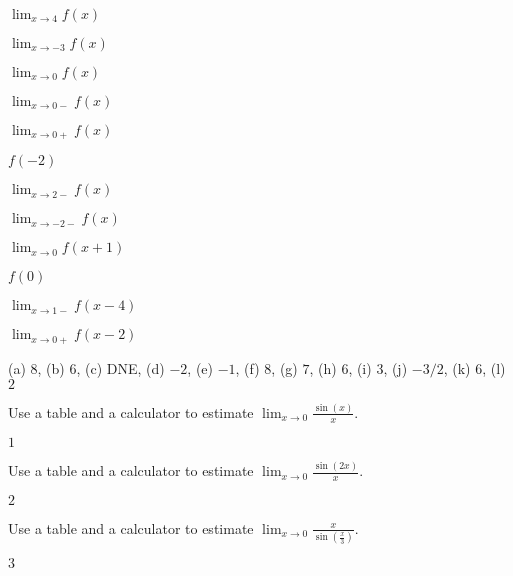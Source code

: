 \begin{exercises}
\begin{exercise}
\begin{marginfigure}
\caption{A plot of $f(x)$, a piecewise defined function.}
\label{plot:piecewise-exercise}
\end{marginfigure}
\begin{enumerate}
\begin{multicols}{3}
\item $\lim_{x\to 4} f(x)$  
\item $\lim_{x\to -3} f(x)$  
\item $\lim_{x\to 0} f(x)$ 
\item $\lim_{x\to 0-} f(x)$  
\item $\lim_{x\to 0+} f(x)$  
\item $f(-2)$  
\item $\lim_{x\to 2-} f(x)$  
\item $\lim_{x\to -2-} f(x)$  
\item $\lim_{x\to 0} f(x+1)$  
\item $f(0)$ 
\item $\lim_{x\to 1-} f(x-4)$  
\item $\lim_{x\to 0+} f(x-2)$
\end{multicols}  
\end{enumerate}
\begin{answer}
 (a) $8$, (b) $6$, (c) DNE,
 (d) $-2$, (e) $-1$, (f) $8$,
 (g) $7$, (h) $6$, (i) $3$,
 (j) $-3/2$, (k) $6$, (l) $2$
\end{answer}
\end{exercise}


\begin{exercise} 
Use a table and a calculator to estimate $\lim_{x\to 0}
\frac{\sin(x)}{x}$.
\begin{answer}
  $1$
\end{answer}
\end{exercise}

\begin{exercise} 
Use a table and a calculator to estimate $\lim_{x\to 0} \frac{\sin(2x)}{x}$.
\begin{answer}
  $2$
\end{answer}
\end{exercise}

\begin{exercise} 
Use a table and a calculator to estimate $\lim_{x\to 0} \frac{x}{\sin\left(\frac{x}{3}\right)}$.
\begin{answer}
  $3$
\end{answer}
\end{exercise}


\end{exercises}
